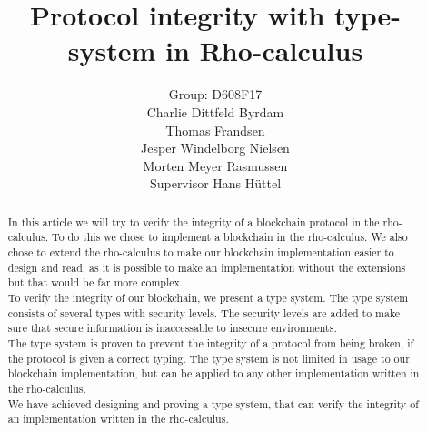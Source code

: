 \mainmatter  %

\title{Protocol integrity with type-system in Rho-calculus}




\author{Group: D608F17\\Charlie Dittfeld Byrdam\\Thomas Frandsen\\Jesper Windelborg Nielsen\\Morten Meyer Rasmussen\\Supervisor Hans Hüttel}




\toctitle{}
\tocauthor{}
\maketitle
\begin{abstract}
In this article we will try to verify the integrity of a blockchain protocol in the rho-calculus. To do this we chose to implement a blockchain in the rho-calculus. We also chose to extend the rho-calculus to make our blockchain implementation easier to design and read, as it is possible to make an implementation without the extensions but that would be far more complex.\\
To verify the integrity of our blockchain, we present a type system. The type system consists of several types with security levels. The security levels are added to make sure that secure information is inaccessable to insecure environments.\\
The type system is proven to prevent the integrity of a protocol from being broken, if the protocol is given a correct typing. The type system is not limited in usage to our blockchain implementation, but can be applied to any other implementation written in the rho-calculus.\\
We have achieved designing and proving a type system, that can verify the integrity of an implementation written in the rho-calculus.
\end{abstract}
\clearpage
